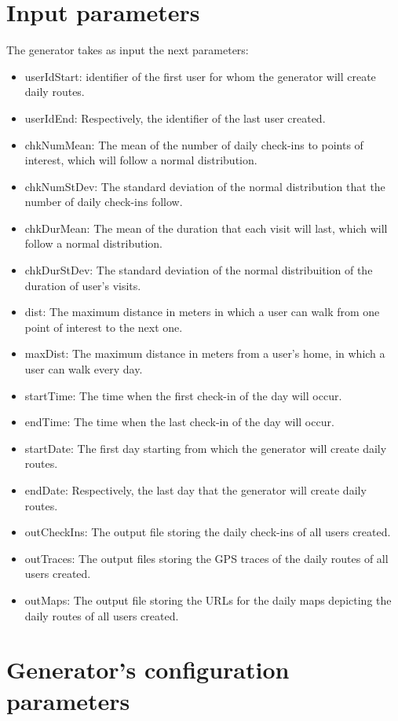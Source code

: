 \section{Input parameters}

The generator takes as input the next parameters: 

\begin{itemize}
 \item userIdStart: identifier of the first user for whom the generator will create daily routes.
 \item userIdEnd: Respectively, the identifier of the last user created.
 \item chkNumMean: The mean of the number of daily check-ins to points of interest, which will follow a normal distribution.
 \item chkNumStDev: The standard deviation of the normal distribution that the number of daily check-ins follow.
 \item chkDurMean: The mean of the duration that each visit will last, which will follow a normal distribution.
 \item chkDurStDev: The standard deviation of the normal distribuition of the duration of user's visits.
 \item dist: The maximum distance in meters in which a user can walk from one point of interest to the next one.
 \item maxDist: The maximum distance in meters from a user's home, in which a user can walk every day.
 \item startTime: The time when the first check-in of the day will occur.
 \item endTime: The time when the last check-in of the day will occur.
 \item startDate: The first day starting from which the generator will create daily routes.
 \item endDate: Respectively, the last day that the generator will create daily routes.
 \item outCheckIns: The output file storing the daily check-ins of all users created.
 \item outTraces: The output files storing the GPS traces of the daily routes of all users created.
 \item outMaps: The output file storing the URLs for the daily maps depicting the daily routes of all users created.
\end{itemize}

\section{Generator's configuration parameters}

